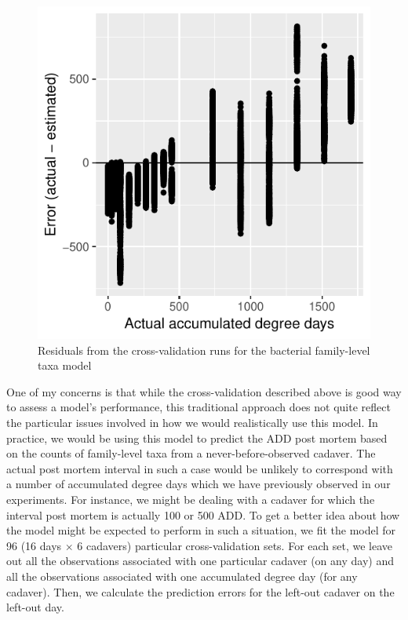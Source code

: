 \documentclass{article}
\begin{document}
\begin{figure}
  \centering
  \includegraphics{../revise_algorithm/only_families/all_time_steps/hit_1perc_twice/orig_units_all_data_families_residuals}
  \caption{Residuals from the cross-validation runs for the bacterial
    family-level taxa model}
  \label{fig:resids_cv_bac_family_taxa}
\end{figure}

One of my concerns is that while the cross-validation described above
is good way to assess a model's performance, this traditional approach
does not quite reflect the particular issues involved in how we would
realistically use this model.  In practice, we would be using this
model to predict the ADD post mortem based on the counts of
family-level taxa from a never-before-observed cadaver.  The actual
post mortem interval in such a case would be unlikely to correspond
with a number of accumulated degree days which we have previously
observed in our experiments.  For instance, we might be dealing with a
cadaver for which the interval post mortem is actually 100 or 500 ADD.
To get a better idea about how the model might be expected to perform
in such a situation, we fit the model for 96 (16 days $\times$ 6
cadavers) particular cross-validation sets.  For each set, we leave
out all the observations associated with one particular cadaver (on
any day) and all the observations associated with one accumulated
degree day (for any cadaver).  Then, we calculate the prediction
errors for the left-out cadaver on the left-out day.
\end{document}
